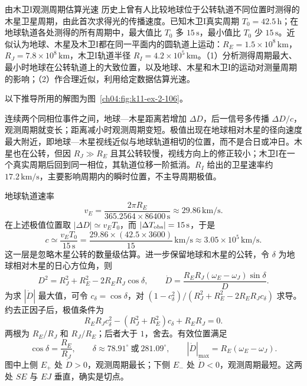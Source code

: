 {\begin{origexamplebox}{由木卫I观测周期估算光速}\label{ch04:ex:k11-2-106}
历史上曾有人比较地球位于公转轨道不同位置时测得的木星卫星周期，由此首次求得光的传播速度。已知木卫I真实周期 $T_0=42.5\,\mathrm h$；在地球轨道各处测得的所有周期中，最大值比 $T_0$ 多 $15\,\mathrm s$，最小值比 $T_0$ 少 $15\,\mathrm s$。近似认为地球、木星及木卫I都在同一平面内的圆轨道上运动：$R_E=1.5\times10^8\,\mathrm{km}$，$R_J=7.8\times10^8\,\mathrm{km}$，木卫I轨道半径 $R_I=4.2\times10^5\,\mathrm{km}$。（1）分析测得周期最大、最小时地球在公转轨道上的大致位置，以及地球、木星和木卫I的运动对测量周期的影响；（2）作合理近似，利用给定数据估算光速。

\begin{qualityfigure}
\label{mech:04:106:q}
\end{qualityfigure}
\end{origexamplebox}
\begin{xesolution}
以下推导所用的解图为图~\ref{ch04:fig:k11-ex-2-106}。

连续两个同相位事件之间，地球—木星距离若增加 $\Delta D$，后一信号多传播 $\Delta D/c$，观测周期就变长；距离减小时观测周期变短。极值出现在地球相对木星的径向速度最大附近，即地球—木星视线近似与地球轨道相切的位置，而不是合日或冲日。木星也在公转，但因 $R_J\gg R_E$ 且其公转较慢，视线方向上的修正较小；木卫I在一个真实周期后回到同一相位，其轨道位移一阶抵消。$R_I$ 给出的卫星速率约 $17.2\,\mathrm{km/s}$，主要影响周期内的瞬时位置，不主导周期极值。
\RomerDiagram

地球轨道速率
\[
v_E=\frac{2\pi R_E}{365.2564\times86400\,\mathrm s}
\approx29.86\,\mathrm{km/s}.
\]
在上述极值位置取 $|\Delta D|\simeq v_ET_0$，而 $|\Delta T_{\rm obs}|=15\,\mathrm s$，于是
\[
c\simeq\frac{v_ET_0}{15\,\mathrm s}
=\frac{29.86\times(42.5\times3600)}{15}\,\mathrm{km/s}
\approx\boxed{3.05\times10^5\,\mathrm{km/s}}.
\]
这一层是忽略木星公转的数量级估算。进一步保留地球和木星的公转，令 $\delta$ 为地球相对木星的日心方位角，则
\[
D^2=R_J^2+R_E^2-2R_ER_J\cos\delta,\qquad
\dot D=\frac{R_ER_J(\omega_E-\omega_J)\sin\delta}{D}.
\]
为求 $|\dot D|$ 最大值，可令 $c_\delta=\cos\delta$，对 $(1-c_\delta^2)/(R_J^2+R_E^2-2R_ER_Jc_\delta)$ 求导。约去正因子后，极值条件为
\[
R_ER_Jc_\delta^2-(R_J^2+R_E^2)c_\delta+R_ER_J=0.
\]
两根为 $R_E/R_J$ 和 $R_J/R_E$；后者大于 $1$，舍去。有效位置满足
\[
\cos\delta=\frac{R_E}{R_J},\qquad
\delta\approx78.91^\circ\ \text{或}\ 281.09^\circ,
\qquad |\dot D|_{\max}=R_E(\omega_E-\omega_J).
\]
图中上侧 $E_+$ 处 $\dot D>0$，观测周期最长；下侧 $E_-$ 处 $\dot D<0$，观测周期最短。这两处 $SE$ 与 $EJ$ 垂直，确实是切点。


\end{xesolution}}
